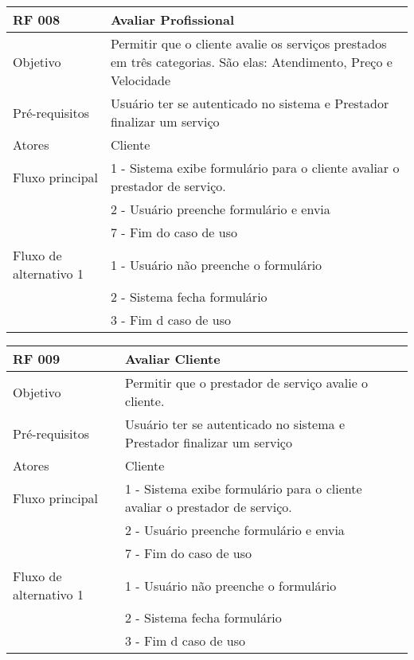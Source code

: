 \documentclass{article}
\begin{document}
\begin{table}[h!]
  \begin{center}
    \label{tab:table10}
    \begin{tabular}{|l|l|}
      \hline
      \textbf{RF 008} & \textbf{Avaliar Profissional}\\
      \hline
      Objetivo          & Permitir que o cliente avalie os serviços prestados em três categorias. São elas: Atendimento, Preço e Velocidade \\
      \hline
      Pré-requisitos    & Usuário ter se autenticado no sistema e Prestador finalizar um serviço \\
      \hline
      Atores            & Cliente \\
      \hline
      Fluxo principal   & 1 - Sistema exibe formulário para o cliente avaliar o prestador de serviço. \\
                        & 2 - Usuário preenche formulário e envia \\
                        & 7 - Fim do caso de uso \\
      \hline
      Fluxo de alternativo 1    & 1 - Usuário não preenche o formulário \\
                                & 2 - Sistema fecha formulário \\
                                & 3 - Fim d caso de uso \\
      \hline
    \end{tabular}
  \end{center}
\end{table}

\begin{table}[h!]
  \begin{center}
    \label{tab:table11}
    \begin{tabular}{|l|l|}
      \hline
      \textbf{RF 009} & \textbf{Avaliar Cliente}\\
      \hline
      Objetivo          & Permitir que o prestador de serviço avalie o cliente. \\
      \hline
      Pré-requisitos    & Usuário ter se autenticado no sistema e Prestador finalizar um serviço \\
      \hline
      Atores            & Cliente \\
      \hline
      Fluxo principal   & 1 - Sistema exibe formulário para o cliente avaliar o prestador de serviço. \\
                        & 2 - Usuário preenche formulário e envia \\
                        & 7 - Fim do caso de uso \\
      \hline
      Fluxo de alternativo 1    & 1 - Usuário não preenche o formulário \\
                                & 2 - Sistema fecha formulário \\
                                & 3 - Fim d caso de uso \\
      \hline
    \end{tabular}
  \end{center}
\end{table}
\end{document}
